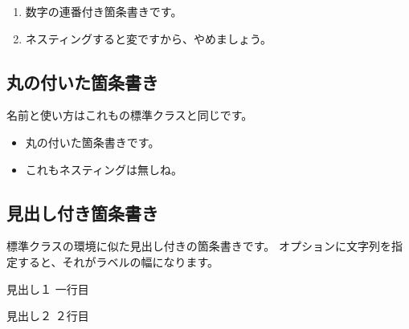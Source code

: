 \documentclass[横,B5,禁則,名前]{genkou}
\begin{document}
\begin{enumerate}
    \item 数字の連番付き箇条書きです。
    \item ネスティングすると変ですから、やめましょう。
\end{enumerate}

\subsection{丸の付いた箇条書き}
名前と使い方はこれも\oubun{\LaTeX}の標準クラスと同じです。

\begin{itemize}
    \item 丸の付いた箇条書きです。
    \item これもネスティングは無しね。
\end{itemize}

\subsection{見出し付き箇条書き}
標準クラスの環境に似た見出し付きの箇条書きです。
オプションに文字列を指定すると、それがラベルの幅になります。

\begin{kajogaki}[ああああああ]
    \item[見出し１]一行目
    \item[見出し２]２行目
\end{kajogaki}
\end{document}
